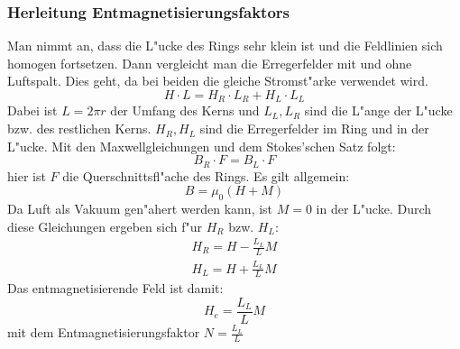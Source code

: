         \subsubsection*{Herleitung Entmagnetisierungsfaktors}
            Man nimmt an, dass die L"ucke des Rings sehr klein ist und die Feldlinien sich homogen
            fortsetzen. Dann vergleicht man die Erregerfelder mit und ohne Luftspalt. Dies geht, da
            bei beiden die gleiche Stromst"arke verwendet wird.
            \begin{equation}
                H \cdot L = H_R \cdot L_R + H_L \cdot L_L
            \end{equation}
            Dabei ist $L = 2 \pi r$ der Umfang des Kerns und $L_L, L_R$ sind die L"ange der L"ucke bzw. des restlichen Kerns.
            $H_R, H_L$ sind die Erregerfelder im Ring und in der L"ucke.
            Mit den Maxwellgleichungen und dem Stokes'schen Satz folgt:
            \begin{equation}
                B_R \cdot F = B_L \cdot F
            \end{equation}
            hier ist $F$ die Querschnittsfl"ache des Rings. Es gilt allgemein:
            \begin{equation}
                B = \mu_0 (H + M)
            \end{equation}
            Da Luft als Vakuum gen"ahert werden kann, ist $M=0$ in der L"ucke.
            Durch diese Gleichungen ergeben sich f"ur $H_R$ bzw. $H_L$:
            \begin{align*}
                H_R = H - \frac{L_L}{L} M\\
                H_L = H + \frac{L_L}{L} M
            \end{align*}
            Das entmagnetisierende Feld ist damit:
            \begin{equation}
                H_e = \frac{L_L}{L} M
            \end{equation}
            mit dem Entmagnetisierungsfaktor $N = \frac{L_L}{L}$
